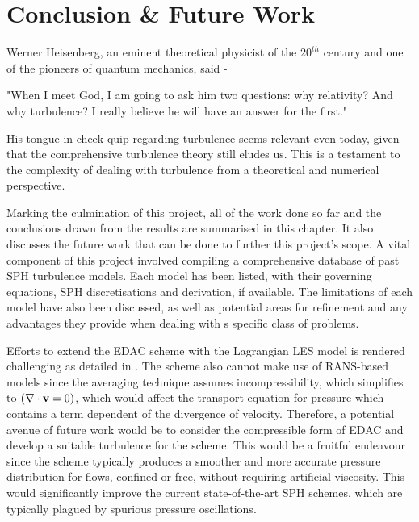 
\chapter{Conclusion \& Future Work} %
\label{chap:conclusions-and-future-work}

Werner Heisenberg, an eminent theoretical physicist of the $20^{th}$ century and one of the pioneers of quantum mechanics, said -
\begin{displayquote}
    "When I meet God, I am going to ask him two questions: why relativity? And why turbulence? I really believe he will have an answer for the first."
\end{displayquote}
His tongue-in-cheek quip regarding turbulence seems relevant even today, given that the comprehensive turbulence theory still eludes us. This is a testament to the complexity of dealing with turbulence from a theoretical and numerical perspective. 

Marking the culmination of this project, all of the work done so far and the conclusions drawn from the results are summarised in this chapter. It also discusses the future work that can be done to further this project's scope.
A vital component of this project involved compiling a comprehensive database of past SPH turbulence models. Each model has been listed, with their governing equations, SPH discretisations and derivation, if available. The limitations of each model have also been discussed, as well as potential areas for refinement and any advantages they provide when dealing with s specific class of problems.

Efforts to extend the EDAC scheme \parencite{Ramachandran2019} with the Lagrangian LES model is rendered challenging as detailed in . The scheme also cannot make use of RANS-based models since the averaging technique assumes incompressibility, which simplifies to $(\nabla \cdot \mathbf{v} = 0)$, which would affect the transport equation for pressure  which contains a term dependent of the divergence of velocity.
Therefore, a potential avenue of future work would be to consider the compressible form of EDAC \parencite{Chola2021} and develop a suitable turbulence for the scheme. This would be a fruitful endeavour since the scheme typically produces a smoother and more accurate pressure distribution for flows, confined or free, without requiring artificial viscosity. This would significantly improve the current state-of-the-art SPH schemes, which are typically plagued by spurious pressure oscillations.

